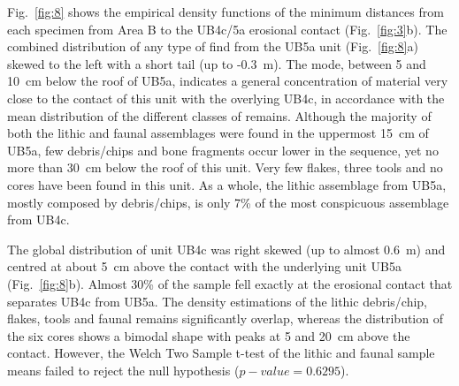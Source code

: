 \documentclass[review,authoryear,times]{elsarticle} %
\begin{document}

Fig.~\ref{fig:8} shows the empirical density functions of the minimum distances from each specimen from Area B to the UB4c/5a erosional contact (Fig.~\ref{fig:3}b). The combined distribution of any type of find from the UB5a unit (Fig.~\ref{fig:8}a) skewed to the left with a short tail (up to -0.3~m). The mode, between 5 and 10~cm below the roof of UB5a, indicates a general concentration of material very close to the contact of this unit with the overlying UB4c, in accordance with the mean distribution of the different classes of remains. %
Although the majority of both the lithic and faunal assemblages were found in the uppermost 15~cm of UB5a, few debris/chips and bone fragments occur lower in the sequence, yet no more than 30~cm below the roof of this unit. Very few flakes, three tools and no cores have been found in this unit. As a whole, the lithic assemblage from UB5a, mostly composed by debris/chips, is only 7\% of the most conspicuous assemblage from UB4c.

The global distribution of unit UB4c was right skewed (up to almost 0.6~m) and centred at about 5~cm above the contact with the underlying unit UB5a (Fig.~\ref{fig:8}b). Almost 30\% of the sample fell exactly at the erosional contact that separates UB4c from UB5a. The density estimations of the lithic debris/chip, flakes, tools and faunal remains significantly overlap, whereas the distribution of the six cores shows a bimodal shape with peaks at 5 and 20~cm above the contact. However, the Welch Two Sample t-test of the lithic and faunal sample means failed to reject the null hypothesis ($p-value=0.6295$). %
\end{document}
